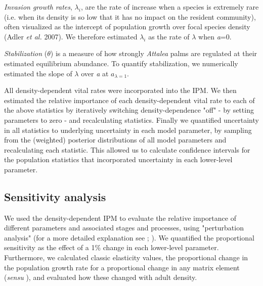 \documentclass[b5paper,justified]{tufte-book} %
\begin{document}
\begin{fullwidth}
\emph{Invasion growth rates}, $\lambda_i$, are the rate of increase when a species is extremely rare (i.e. when its density is so low that it has no impact on the resident community), often visualized as the intercept of population growth over focal species density (Adler \emph{et al.} 2007). We therefore estimated $\lambda_i$ as the rate of $\lambda$ when \textit{a}=0.  
\vspace{0.5cm}

\emph{Stabilization} ($\theta$) is a measure of how strongly \textit{Attalea} palms are regulated at their estimated equilibrium abundance. To quantify stabilization, we numerically estimated the slope of $\lambda$ over \textit{a} at $a_{\lambda=1}$.  
\vspace{0.5cm}

All density-dependent vital rates were incorporated into the IPM. We then estimated the relative importance of each density-dependent vital rate to each of the above statistics by iteratively switching density-dependence "off" - by setting parameters to zero - and recalculating statistics. 
Finally we quantified uncertainty in all statistics to underlying uncertainty in each model parameter, by sampling from the (weighted) posterior distributions of all model parameters and recalculating each statistic. This allowed us to calculate confidence intervals for the population statistics that incorporated uncertainty in each lower-level parameter.

\subsection{Sensitivity analysis} 
We used the density-dependent IPM to evaluate the relative importance of different parameters and associated stages and processes, using "perturbation analysis" (for a more detailed explanation see \citealt{Caswell2001}; \citealt{Zuidema2001}).  We quantified the proportional sensitivity as the effect of a 1\% change in each lower-level parameter. Furthermore, we calculated classic elasticity values, the proportional change in the population growth rate for a proportional change in any matrix element (\textit{sensu} \citealt{Caswell2001}), and evaluated how these changed with adult density. 



\end{fullwidth}
\end{document}
